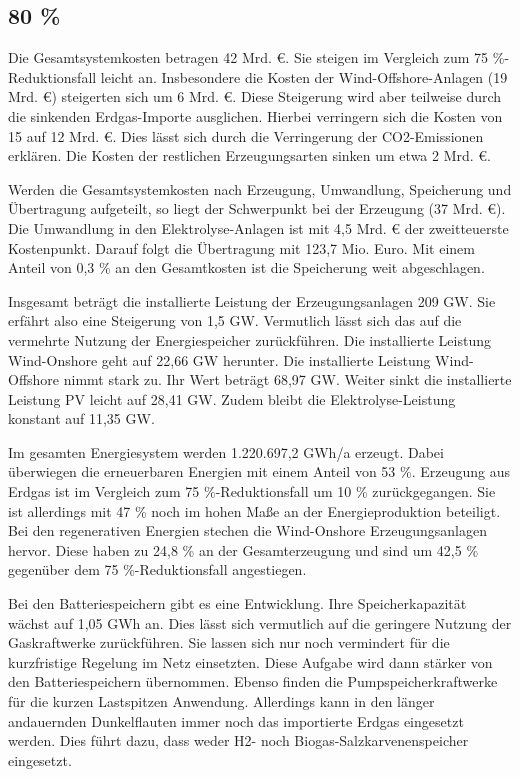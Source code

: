 

\subsection{80 \%}
Die Gesamtsystemkosten betragen 42 Mrd. €. Sie steigen im Vergleich zum 75 \%-Reduktionsfall leicht an. Insbesondere die Kosten der Wind-Offshore-Anlagen (19 Mrd. €) steigerten sich um 6 Mrd. €. Diese Steigerung wird aber teilweise durch die sinkenden Erdgas-Importe ausglichen. Hierbei verringern sich die Kosten von 15 auf 12 Mrd. €. Dies lässt sich durch die Verringerung der CO2-Emissionen erklären. Die Kosten der restlichen Erzeugungsarten sinken um etwa 2 Mrd. €.

Werden die Gesamtsystemkosten nach Erzeugung, Umwandlung, Speicherung und Übertragung aufgeteilt, so liegt der Schwerpunkt bei der Erzeugung (37 Mrd. €). Die Umwandlung in den Elektrolyse-Anlagen ist mit 4,5 Mrd. € der zweitteuerste Kostenpunkt. Darauf folgt die Übertragung mit 123,7 Mio. Euro. Mit einem Anteil von 0,3 \% an den Gesamtkosten ist die Speicherung weit abgeschlagen.

Insgesamt beträgt die installierte Leistung der Erzeugungsanlagen 209 GW. Sie erfährt also eine Steigerung von 1,5 GW. Vermutlich lässt sich das auf die vermehrte Nutzung der Energiespeicher zurückführen. Die installierte Leistung Wind-Onshore geht auf 22,66 GW herunter. Die installierte Leistung Wind-Offshore nimmt stark zu. Ihr Wert beträgt 68,97 GW.  Weiter sinkt die installierte Leistung PV leicht auf 28,41 GW. Zudem bleibt die Elektrolyse-Leistung konstant auf 11,35 GW. 

Im gesamten Energiesystem werden 1.220.697,2 GWh/a erzeugt. Dabei überwiegen die erneuerbaren Energien mit einem Anteil von 53 \%. Erzeugung aus Erdgas ist im Vergleich zum 75 \%-Reduktionsfall um 10 \% zurückgegangen. Sie ist allerdings mit 47 \% noch im hohen Maße an der Energieproduktion beteiligt. Bei den regenerativen Energien stechen die Wind-Onshore Erzeugungsanlagen hervor. Diese haben zu 24,8 \% an der Gesamterzeugung und sind um 42,5 \% gegenüber dem 75 \%-Reduktionsfall angestiegen. 

Bei den Batteriespeichern gibt es eine Entwicklung. Ihre Speicherkapazität wächst auf 1,05 GWh an. Dies lässt sich vermutlich auf die geringere Nutzung der Gaskraftwerke zurückführen. Sie lassen sich nur noch vermindert für die kurzfristige Regelung im Netz einsetzten. Diese Aufgabe wird dann stärker von den Batteriespeichern übernommen. Ebenso finden die Pumpspeicherkraftwerke für die kurzen Lastspitzen Anwendung. Allerdings kann in den länger andauernden Dunkelflauten immer noch das importierte Erdgas eingesetzt werden. Dies führt dazu, dass weder H2- noch Biogas-Salzkarvenenspeicher eingesetzt. 

